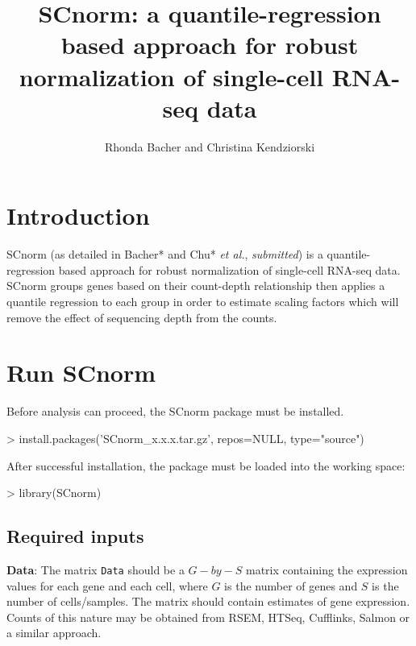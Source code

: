 \documentclass{article}
\begin{document}

\title{SCnorm: a quantile-regression based approach for robust normalization of single-cell RNA-seq data}
\author{Rhonda Bacher and Christina Kendziorski}
\maketitle
\tableofcontents
\setcounter{tocdepth}{2}

\section{Introduction}
\label{sec:intro}
SCnorm (as detailed in Bacher* and Chu* {\it et al.}, {\it{submitted}}) 
is a quantile-regression based approach for robust normalization of 
single-cell RNA-seq data. SCnorm groups genes based on their count-depth relationship then applies a quantile regression to each group in order to estimate scaling factors which will remove the effect of sequencing depth from the counts. 

\section{Run SCnorm}
\label{sec:quickstart}
Before analysis can proceed, the SCnorm package must be installed.
\begin{Schunk}
\begin{Sinput}
> install.packages('SCnorm_x.x.x.tar.gz', repos=NULL, type="source")
\end{Sinput}
\end{Schunk}

After successful installation, the package must be loaded into the working space:
\begin{Schunk}
\begin{Sinput}
>   library(SCnorm)
\end{Sinput}
\end{Schunk}
  
  \subsection{Required inputs}
\label{sec:startgenedeinput}
\begin{flushleft}
{\bf Data}:  The matrix \verb+Data+ should be a $G-by-S$ matrix
containing the expression values for each gene and each cell,
where $G$ is the number of genes and $S$ is the number of cells/samples. The matrix should contain
estimates of gene expression. Counts of this nature may be obtained from RSEM, HTSeq, Cufflinks, Salmon or a similar approach.
\end{flushleft}
\end{document}
